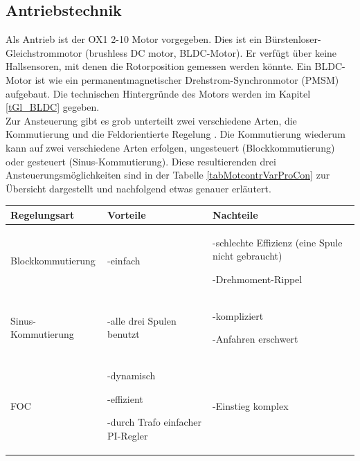 \subsection*{Antriebstechnik}
Als Antrieb ist der OX1 2-10 Motor vorgegeben. Dies ist ein Bürstenloser-Gleichstrommotor (brushless DC motor, BLDC-Motor). Er verfügt über keine Hallsensoren, mit denen die Rotorposition gemessen werden könnte. Ein BLDC-Motor ist wie ein permanentmagnetischer Drehstrom-Synchronmotor (PMSM) aufgebaut. Die technischen Hintergründe des Motors werden im Kapitel \ref{tGl_BLDC} gegeben. 
\\
Zur Ansteuerung gibt es grob unterteilt zwei verschiedene Arten, die Kommutierung und die Feldorientierte Regelung \cite{BLDC}. Die Kommutierung wiederum kann auf zwei verschiedene Arten erfolgen, ungesteuert (Blockkommutierung) oder gesteuert (Sinus-Kommutierung). Diese resultierenden drei Ansteuerungsmöglichkeiten sind in der Tabelle \ref{tabMotcontrVarProCon} zur Übersicht dargestellt und nachfolgend etwas genauer erläutert. 
\begin{center}
	\begin{tabularx}{\textwidth}{l|X|X}
		Regelungsart & Vorteile & Nachteile \\ 
		\hline 
		Blockkommutierung & -einfach & -schlechte Effizienz (eine Spule nicht gebraucht) 
		
		-Drehmoment-Rippel \\
		\hline 
		Sinus-Kommutierung & -alle drei Spulen benutzt & -kompliziert
		
		-Anfahren erschwert \\ 
		\hline 
		FOC & -dynamisch 
		
		-effizient 
		
		-durch Trafo einfacher PI-Regler & -Einstieg komplex \\ 
		\hline 
	\end{tabularx} 
	\label{tabMotcontrVarProCon}
\end{center}

